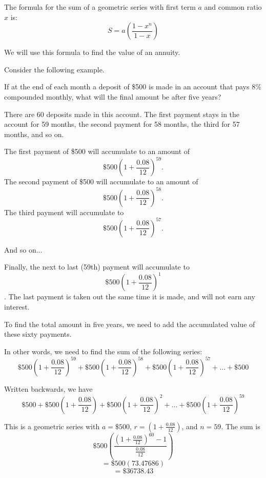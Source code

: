 The formula for the sum of a geometric series with first term $a$ and common ratio $x$ is:
\[
    S = a\left(\frac{1 - x^n}{1 - x}\right)
\]

We will use this formula to find the value of an annuity.

Consider the following example.

\begin{example}\label{example_500_annuity}
    If at the end of each month a deposit of \$500 is made in an account that pays 8\% compounded monthly, what will the final amount be after five years?
\end{example}

\begin{solution}
    There are 60 deposits made in this account. The first payment stays in the account for 59 months, the second payment for 58 months, the third for 57 months, and so on.

    The first payment of \$500 will accumulate to an amount of
    \[
        \$500\left(1 + \frac{0.08}{12}\right)^{59}.
    \]
    The second payment of \$500 will accumulate to an amount of
    \[
        \$500\left(1 + \frac{0.08}{12}\right)^{58}.
    \]
    The third payment will accumulate to
    \[
        \$500\left(1 + \frac{0.08}{12}\right)^{57}.
    \]

    And so on...

    Finally, the next to last (59th) payment will accumulate to
    \[
        \$500(1 + \frac{0.08}{12})^{1}
    \].
    The last payment is taken out the same time it is made, and will not earn any interest.

    To find the total amount in five years, we need to add the accumulated value of these sixty payments.

    In other words, we need to find the sum of the following series:
    \[
        \$500\left(1 + \frac{0.08}{12}\right)^{59} + \$500\left(1 + \frac{0.08}{12}\right)^{58} + \$500\left(1 + \frac{0.08}{12}\right)^{57} + \ldots + \$500
    \]

    Written backwards, we have
    \[
        \$500 + \$500\left(1 + \frac{0.08}{12}\right) + \$500\left(1 + \frac{0.08}{12}\right)^2 + \ldots + \$500\left(1 + \frac{0.08}{12}\right)^{59}
    \]


    This is a geometric series with \( a = \$500 \), \( r = (1 + \frac{0.08}{12}) \), and \( n = 59 \). The sum is
    \[ \$500\left(\frac{(1 + \frac{0.08}{12})^{60} - 1}{\frac{0.08}{12}}\right) \]
    \[ = \$500(73.47686) \]
    \[ = \$36738.43 \]
\end{solution}

